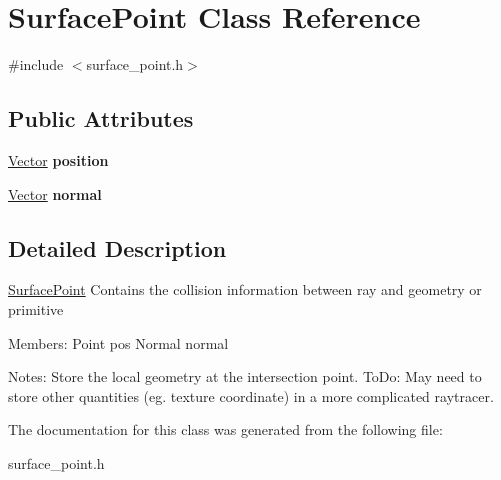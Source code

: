 \hypertarget{class_surface_point}{}\section{Surface\+Point Class Reference}
\label{class_surface_point}


{\ttfamily \#include $<$surface\+\_\+point.\+h$>$}

\subsection*{Public Attributes}
\begin{DoxyCompactItemize}
\item 
\mbox{\label{class_surface_point_a08f317429035a1cc8b52646d472451a3}} 
\mbox{\hyperlink{struct_vector}{Vector}} {\bfseries position}
\item 
\mbox{\label{class_surface_point_ac7064733be92b5cc4b8d68ce63d65bf1}} 
\mbox{\hyperlink{struct_vector}{Vector}} {\bfseries normal}
\end{DoxyCompactItemize}


\subsection{Detailed Description}
\mbox{\hyperlink{class_surface_point}{Surface\+Point}} Contains the collision information between ray and geometry or primitive

Members\+: Point pos Normal normal

Notes\+: Store the local geometry at the intersection point. To\+Do\+: May need to store other quantities (eg. texture coordinate) in a more complicated raytracer. 

The documentation for this class was generated from the following file\+:\begin{DoxyCompactItemize}
\item 
surface\+\_\+point.\+h\end{DoxyCompactItemize}
